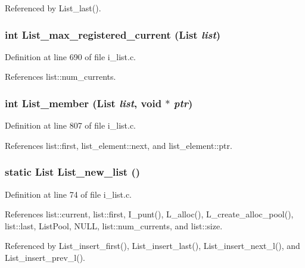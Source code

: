 Referenced by List\_\-last().
\subsubsection{\setlength{\rightskip}{0pt plus 5cm}int List\_\-max\_\-registered\_\-current (\bf{List} {\em list})}\label{i__list_8c_922f0311a02bb6f7b05181999b560139}




Definition at line 690 of file i\_\-list.c.

References list::num\_\-currents.
\subsubsection{\setlength{\rightskip}{0pt plus 5cm}int List\_\-member (\bf{List} {\em list}, void $\ast$ {\em ptr})}\label{i__list_8c_12d4f8ec185eb9574fc29c0cd683132b}




Definition at line 807 of file i\_\-list.c.

References list::first, list\_\-element::next, and list\_\-element::ptr.
\subsubsection{\setlength{\rightskip}{0pt plus 5cm}static \bf{List} List\_\-new\_\-list ()\hspace{0.3cm}{\tt  [static]}}\label{i__list_8c_40ac8d98f1f60d31969dbfdfcd247197}




Definition at line 74 of file i\_\-list.c.

References list::current, list::first, I\_\-punt(), L\_\-alloc(), L\_\-create\_\-alloc\_\-pool(), list::last, List\-Pool, NULL, list::num\_\-currents, and list::size.

Referenced by List\_\-insert\_\-first(), List\_\-insert\_\-last(), List\_\-insert\_\-next\_\-l(), and List\_\-insert\_\-prev\_\-l().
